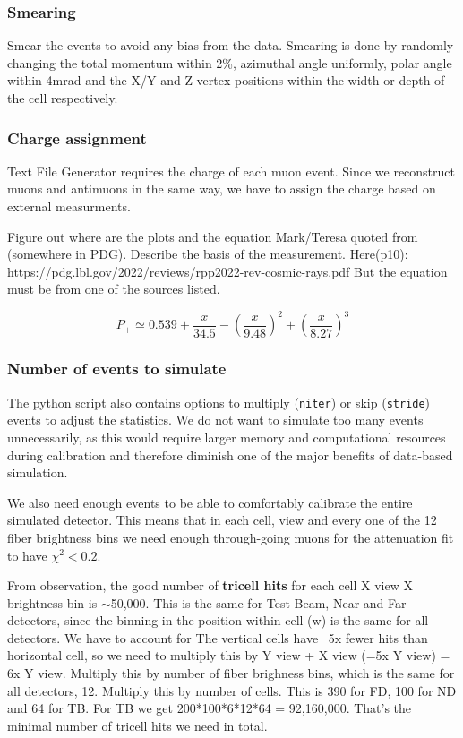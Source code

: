 \documentclass[12pt]{article}
\begin{document}
\subsubsection{Smearing}
Smear the events to avoid any bias from the data. Smearing is done by randomly changing the total momentum within 2\%, azimuthal angle uniformly, polar angle within 4mrad and the X/Y and Z vertex positions within the width or depth of the cell respectively.

\subsubsection{Charge assignment}
Text File Generator requires the charge of each muon event. Since we reconstruct muons and antimuons in the same way, we have to assign the charge based on external measurments.

Figure out where are the plots and the equation Mark/Teresa quoted from (somewhere in PDG). Describe the basis of the measurement.
Here(p10): https://pdg.lbl.gov/2022/reviews/rpp2022-rev-cosmic-rays.pdf
But the equation must be from one of the sources listed.

\begin{equation}
P_+ \simeq 0.539 + \frac{x}{34.5}-\left(\frac{x}{9.48}\right)^2 + \left(\frac{x}{8.27}\right)^3
\end{equation}

\subsubsection{Number of events to simulate}
The python script also contains options to multiply (\texttt{niter}) or skip (\texttt{stride}) events to adjust the statistics. We do not want to simulate too many events unnecessarily, as this would require larger memory and computational resources during calibration and therefore diminish one of the major benefits of data-based simulation.

We also need enough events to be able to comfortably calibrate the entire simulated detector. This means that in each cell, view and every one of the 12 fiber brightness bins we need enough through-going muons for the attenuation fit to have $\chi^2<0.2$.

From observation, the good number of \textbf{tricell hits} for each cell X view X brightness bin is $\sim$50,000. This is the same for Test Beam, Near and Far detectors, since the binning in the position within cell (w) is the same for all detectors. We have to account for 
The vertical cells have ~5x fewer hits than horizontal cell, so we need to multiply this by Y view + X view (=5x Y view) = 6x Y view.
Multiply this by number of fiber brighness bins, which is the same for all detectors, 12.
Multiply this by number of cells. This is 390 for FD, 100 for ND and 64 for TB.
For TB we get 200*100*6*12*64 = 92,160,000. That's the minimal number of tricell hits we need in total.
\end{document}
